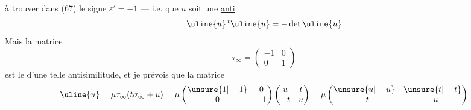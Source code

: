à trouver dans (67) le signe $\varepsilon'=-1$ --- i.e. que
$u$ soit une \uline{anti}
\[
\uline{u}\,{}^t\uline{u}=-\det\uline{u}
\]
Mais  la matrice
\[
\tau_\infty=\begin{pmatrix}-1&0\\0&1\end{pmatrix}
\]
est le  d'une telle antisimilitude, et je
prévois que la matrice
\[
\uline{u}=\mu\tau_\infty(t\sigma_\infty+u)
=\mu\begin{pmatrix}\unsure{1|-1}&0\\0&-1\end{pmatrix}
\begin{pmatrix}u&t\\-t&u\end{pmatrix}
=\mu\begin{pmatrix}\unsure{u|-u}&\unsure{t|-t}\\-t&-u\end{pmatrix}
\]



